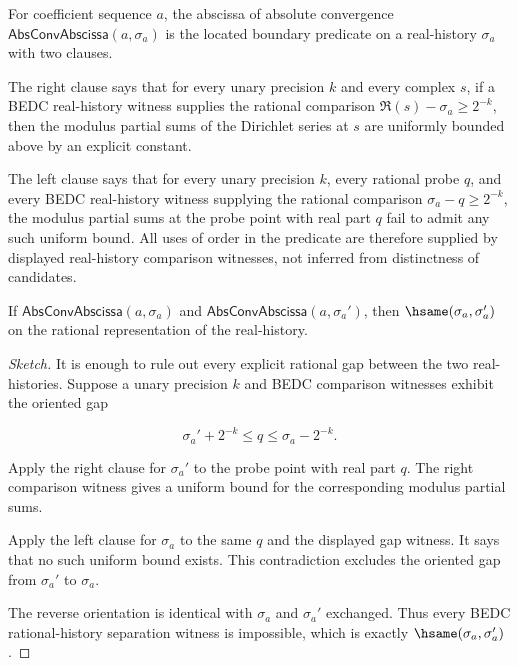 \begin{definition}
\label{def:abs-conv-abscissa}
For coefficient sequence $a$, the abscissa of absolute convergence
$\mathsf{AbsConvAbscissa}(a,\sigma_a)$ is the located boundary predicate on a
real-history $\sigma_a$ with two clauses.

The right clause says that for every unary precision $k$ and every complex $s$,
if a BEDC real-history witness supplies the rational comparison
$\Re(s)-\sigma_a\geq 2^{-k}$, then the modulus partial sums of the Dirichlet
series at $s$ are uniformly bounded above by an explicit constant.

The left clause says that for every unary precision $k$, every rational probe
$q$, and every BEDC real-history witness supplying the rational comparison
$\sigma_a-q\geq 2^{-k}$, the modulus partial sums at the probe point with real
part $q$ fail to admit any such uniform bound. All uses of order in the
predicate are therefore supplied by displayed real-history comparison witnesses,
not inferred from distinctness of candidates.
\end{definition}

\begin{theorem}
\label{thm:abs-conv-abscissa-unique}
If $\mathsf{AbsConvAbscissa}(a,\sigma_a)$ and
$\mathsf{AbsConvAbscissa}(a,\sigma_a')$, then
$\hsame(\sigma_a,\sigma_a')$ on the rational representation of the
real-history.
\end{theorem}
\begin{proof}[Sketch]
It is enough to rule out every explicit rational gap between the two
real-histories. Suppose a unary precision $k$ and BEDC comparison witnesses
exhibit the oriented gap

$$
\sigma_a' + 2^{-k} \leq q \leq \sigma_a - 2^{-k}.
$$

Apply the right clause for $\sigma_a'$ to the probe point with real part $q$.
The right comparison witness gives a uniform bound for the corresponding
modulus partial sums.

Apply the left clause for $\sigma_a$ to the same $q$ and the displayed gap
witness. It says that no such uniform bound exists. This contradiction excludes
the oriented gap from $\sigma_a'$ to $\sigma_a$.

The reverse orientation is identical with $\sigma_a$ and $\sigma_a'$ exchanged.
Thus every BEDC rational-history separation witness is impossible, which is
exactly $\hsame(\sigma_a,\sigma_a')$.
\end{proof}

